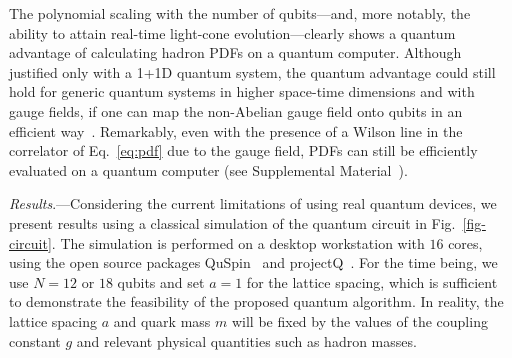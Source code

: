 \documentclass[aps,prl,twocolumn,superscriptaddress,notitlepage,nofootinbib]{revtex4-1}
\begin{document}
The polynomial scaling with the number of qubits---and, more notably, the ability to attain real-time light-cone evolution---clearly shows a quantum advantage of calculating hadron PDFs on a quantum computer. Although justified only with a 1+1D quantum system, the quantum advantage could still hold for generic quantum systems in higher space-time dimensions and with gauge fields, if one can map the non-Abelian gauge field onto qubits in an efficient way~\cite{Brower:1997ha,Banerjee:2012xg,Stryker:2020sap}. Remarkably, even with the presence of a Wilson line in the correlator of Eq.~\eqref{eq:pdf} due to the gauge field, PDFs can still be efficiently evaluated on a quantum computer 
(see Supplemental Material~\cite{supp}).    

\textit{Results}.---Considering the current limitations of using real quantum devices, we present results using a classical simulation of the quantum circuit in Fig.~\ref{fig-circuit}. The simulation is performed on a desktop workstation with $16$ cores, using the open source packages QuSpin~\cite{quspin} and projectQ~\cite{Steiger2018projectqopensource}. For the time being, we use $N = 12$ or $18$ qubits and set $a = 1$ for the lattice spacing, which is sufficient to demonstrate the feasibility of the proposed quantum algorithm. In reality, the lattice spacing $a$ and quark mass $m$ will be fixed by the values of the coupling constant $g$ and relevant physical quantities such as hadron masses.
\end{document}
